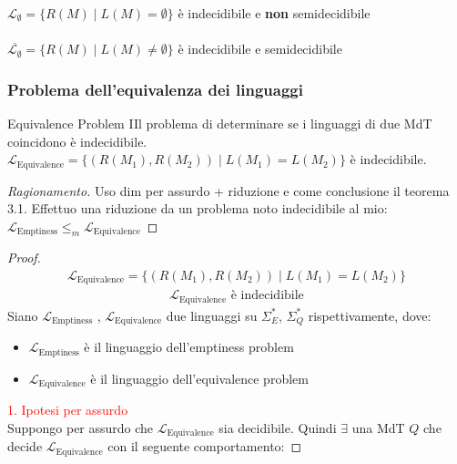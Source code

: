 \documentclass{article}  %
\theoremstyle{definition}
\newenvironment{ragionamento}[1][]
  {\begin{proof}[Ragionamento#1]\renewcommand{\qedsymbol}{}\normalfont}
  {\end{proof}}
\begin{document}
\begin{osservazioni}
	$\mathcal{L}_{\emptyset} = \{R(M) \mid L(M)= \emptyset \}$ è indecidibile e \textbf{non} semidecidibile \\ \\
	$\overline{\mathcal{L}_{\emptyset}} = \{R(M) \mid L(M) \neq \emptyset \}$ è indecidibile e semidecidibile
\end{osservazioni}


\subsubsection{Problema dell'equivalenza dei linguaggi}
\begin{theorem}{Equivalence Problem}
	IIl problema di determinare se i linguaggi di due MdT coincidono è indecidibile. \\
	$\mathcal{L}_{\text{Equivalence}} = \{(R(M_1),R(M_2)) \mid L(M_1)=L(M_2)\}$ è indecidibile.
	\footnotesize %
	\begin{ragionamento}
		Uso dim per assurdo + riduzione e come conclusione il teorema 3.1.
		Effettuo una riduzione da un problema noto indecidibile al mio: $\mathcal{L}_{\text{Emptiness}} \leq_m \mathcal{L}_{\text{Equivalence}}$
	\end{ragionamento}
	\begin{proof}
		\begin{align*}
			\mathcal{L}_{\text{Equivalence}} = \{(R(M_1),R(M_2)) \mid L(M_1)=L(M_2)\} \tag*{(ipotesi)}
		\end{align*}
		\begin{align*}
			\mathcal{L}_{\text{Equivalence}} \text{ è indecidibile} \tag*{(tesi)}
		\end{align*}
		Siano $\mathcal{L}_{\text{Emptiness}}$ , $\mathcal{L}_{\text{Equivalence}}$ due linguaggi su $\Sigma_E^*$, $\Sigma_Q^*$ rispettivamente, dove:
		\begin{itemize}
			\item $\mathcal{L}_{\text{Emptiness}}$ è il linguaggio dell'emptiness problem
			\item $\mathcal{L}_{\text{Equivalence}}$ è il linguaggio dell'equivalence problem
		\end{itemize}
		\textcolor{red}{1. Ipotesi per assurdo} \\
		Suppongo per assurdo che $\mathcal{L}_{\text{Equivalence}}$ sia decidibile. Quindi $\exists$ una MdT $Q$ che decide
		$\mathcal{L}_{\text{Equivalence}}$ con il seguente comportamento:

\end{proof}
\end{theorem}
\end{document}
